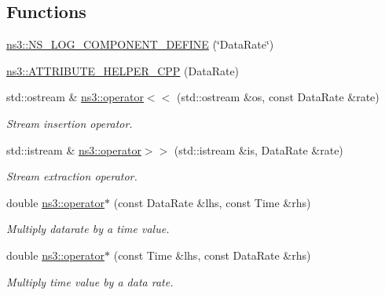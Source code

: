 \subsection*{Functions}
\begin{DoxyCompactItemize}
\item 
\hyperlink{namespacens3_ac40043d1a4d15477d1c63872818dcf17}{ns3\+::\+N\+S\+\_\+\+L\+O\+G\+\_\+\+C\+O\+M\+P\+O\+N\+E\+N\+T\+\_\+\+D\+E\+F\+I\+NE} (\char`\"{}Data\+Rate\char`\"{})
\item 
\hyperlink{namespacens3_aef13974eb984da0d74efbbb35a9dd5b5}{ns3\+::\+A\+T\+T\+R\+I\+B\+U\+T\+E\+\_\+\+H\+E\+L\+P\+E\+R\+\_\+\+C\+PP} (Data\+Rate)
\item 
std\+::ostream \& \hyperlink{namespacens3_a75cc796d7ece809ccee8456ff1efeb14}{ns3\+::operator$<$$<$} (std\+::ostream \&os, const Data\+Rate \&rate)
\begin{DoxyCompactList}\small\item\em Stream insertion operator. \end{DoxyCompactList}\item 
std\+::istream \& \hyperlink{namespacens3_aece48f62b5ebf9aca1e78f8c3b0f069f}{ns3\+::operator$>$$>$} (std\+::istream \&is, Data\+Rate \&rate)
\begin{DoxyCompactList}\small\item\em Stream extraction operator. \end{DoxyCompactList}\item 
double \hyperlink{namespacens3_a04d08a98ce4211ac9cf750b882126661}{ns3\+::operator$\ast$} (const Data\+Rate \&lhs, const Time \&rhs)
\begin{DoxyCompactList}\small\item\em Multiply datarate by a time value. \end{DoxyCompactList}\item 
double \hyperlink{namespacens3_a3f9862187d3a93e502f0548b4f6489c8}{ns3\+::operator$\ast$} (const Time \&lhs, const Data\+Rate \&rhs)
\begin{DoxyCompactList}\small\item\em Multiply time value by a data rate. \end{DoxyCompactList}\end{DoxyCompactItemize}
